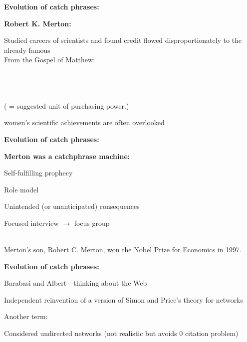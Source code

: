   
  


  \textbf{Evolution of catch phrases:}

  \textbf{Robert K. Merton: }
  
   
    Studied careers of scientists and found credit
    flowed disproportionately to the already famous\\
    \medskip
    {From the Gospel of Matthew:\\
      \\}
    {}\\
    {\\}
    { }
  
    ( = suggested unit of purchasing power.)
  
    { women's scientific achievements are often overlooked}
  
  


  \textbf{Evolution of catch phrases:}

  \textbf{Merton was a catchphrase machine:}
  
   
    Self-fulfilling prophecy
   
    Role model
   
    Unintended (or unanticipated) consequences
   
    Focused interview $\rightarrow$ focus group
  

  {}\\
  \medskip
  {Merton's son, Robert C. Merton, won the Nobel Prize for Economics in 1997.}
  


  \textbf{Evolution of catch phrases:}

  
  
   
    Barabasi and Albert\cite{barabasi1999a}---thinking about the Web
   
    Independent reinvention of a version of Simon and Price's theory for networks
   
    Another term: 
   
    Considered undirected networks (not realistic but avoids 0 citation problem)
   
